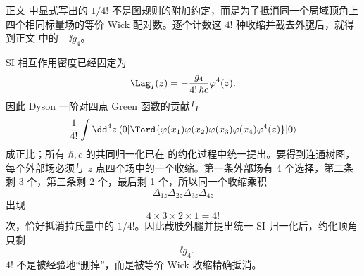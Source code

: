 
\begin{derivation}

正文 中显式写出的 $1/4!$ 不是图规则的附加约定，而是为了抵消同一个局域顶角上四个相同标量场的等价 Wick 配对数。逐个计数这 $4!$ 种收缩并截去外腿后，就得到正文 中的 $-\ii g_4$。



SI 相互作用密度已经固定为
\begin{equation*}
 \Lag_I(z)=-\frac{g_4}{4!\,\hbar c}\varphi^4(z).
\end{equation*}
因此 Dyson 一阶对四点 Green 函数的贡献与
\begin{equation*}
 \frac{1}{4!}
 \int\dd^4 z\,
 \langle0|\Tord\{
 \varphi(x_1)\varphi(x_2)\varphi(x_3)\varphi(x_4)
 \varphi^4(z)
 \}|0\rangle
 \end{equation*}
成正比；所有 $\hbar,c$ 的共同归一化已在
的约化过程中统一提出。要得到连通树图，每个外部场必须与 $z$ 点四个场中的一个收缩。第一条外部场有 4 个选择，第二条剩 3 个，第三条剩 2 个，最后剩 1 个，所以同一个收缩乘积
\begin{equation*}
 \Delta_{1z}\Delta_{2z}\Delta_{3z}\Delta_{4z}
\end{equation*}
出现
\begin{equation*}
 4\times3\times2\times1=4!
\end{equation*}
次，恰好抵消拉氏量中的 $1/4!$。因此截肢外腿并提出统一 SI 归一化后，约化顶角只剩
\begin{equation*}
 {-\ii g_4.}
\end{equation*}
$4!$ 不是被经验地“删掉”，而是被等价 Wick 收缩精确抵消。
\end{derivation}

